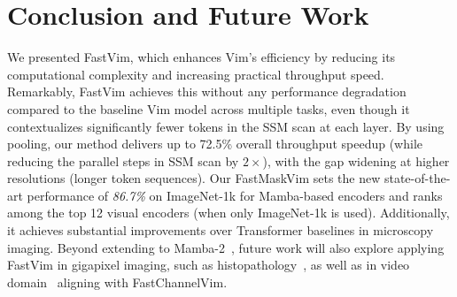 \section{Conclusion and Future Work}
\label{sec:conclusion}


We presented FastVim, which enhances Vim's efficiency by reducing its computational complexity and increasing practical throughput speed. Remarkably, FastVim achieves this without any performance degradation compared to the baseline Vim model across multiple tasks, even though it contextualizes significantly fewer tokens in the SSM scan at each layer. By using pooling, our method delivers up to 72.5\% overall throughput speedup (while reducing the parallel steps in SSM scan by \(2\times\)), with the gap widening at higher resolutions (longer token sequences). Our FastMaskVim sets the new state-of-the-art performance of \textit{86.7\%} on ImageNet-1k for Mamba-based encoders and ranks among the top 12 visual encoders (when only ImageNet-1k is used). Additionally, it achieves substantial improvements over Transformer baselines in microscopy imaging. Beyond extending to Mamba-2~\cite{mamba2}, future work will also explore applying FastVim in gigapixel imaging, such as histopathology~\cite{nasiri2024vim4path, graikos2024learned, xu2024whole}, as well as in video domain~\cite{li2025videomamba, das2021vpn++, ashutosh2023hiervl} aligning with FastChannelVim.
